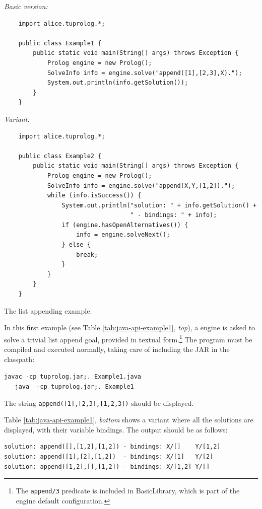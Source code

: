 \begin{table}
\textit{Basic version:}
{\small{
\begin{verbatim}
    import alice.tuprolog.*;

    public class Example1 {
        public static void main(String[] args) throws Exception {
            Prolog engine = new Prolog();
            SolveInfo info = engine.solve("append([1],[2,3],X).");
            System.out.println(info.getSolution());
        }
    }
\end{verbatim}
}}
\textit{Variant:}
{\small{
\begin{verbatim}
    import alice.tuprolog.*;

    public class Example2 {
        public static void main(String[] args) throws Exception {
            Prolog engine = new Prolog();
            SolveInfo info = engine.solve("append(X,Y,[1,2]).");
            while (info.isSuccess()) {
                System.out.println("solution: " + info.getSolution() +
                                   " - bindings: " + info);
                if (engine.hasOpenAlternatives()) {
                    info = engine.solveNext();
                } else {
                    break;
                }
            }
        }
    }
\end{verbatim}
}}
\caption{The list appending example.}
\label{tab:java-api-example1}
\end{table}

In this first example (see Table \ref{tab:java-api-example1}, \textit{top}), a \tuprolog{} engine is asked to solve a trivial list append goal, provided in textual form.\footnote{The \texttt{append/3} predicate is included in BasicLibrary, which is part of the engine default configuration.}
%
The program must be compiled and executed normally, taking care of including the \tuprolog{} JAR in the classpath:

\texttt{javac -cp tuprolog.jar;. Example1.java}\\
\texttt{\mbox{~~~}java~ -cp tuprolog.jar;. Example1}

\noindent The string \texttt{append([1],[2,3],[1,2,3])} should be displayed.

\medskip

\noindent Table \ref{tab:java-api-example1}, \textit{bottom} shows a variant where all the solutions are displayed, with their variable bindings. The output should be as follows:

\begin{verbatim}
solution: append([],[1,2],[1,2]) - bindings: X/[]    Y/[1,2]
solution: append([1],[2],[1,2])  - bindings: X/[1]   Y/[2]
solution: append([1,2],[],[1,2]) - bindings: X/[1,2] Y/[]
\end{verbatim}


